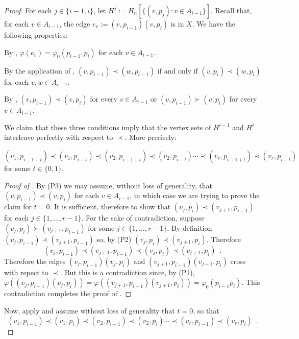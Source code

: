 \documentclass[kpfonts]{patmorin}
\begin{document}
\begin{proof}
    For each $j\in\{i-1,i\}$, let $H^j:=H_n[\{(v,p_j):v\in A_{i-1}\}]$.
    Recall that, for each $v\in A_{i-1}$, the edge $e_v:=(v,p_{i-1})(v,p_i)$ is in $X$.  We have the following properties:
    \begin{compactenum}[(P1)]
        \item By , $\varphi(e_v)=\varphi_0(p_{i-1},p_i)$ for each $v\in A_{i-1}$.
        \item By the application of , $(v,p_{i-1})\prec (w,p_{i-1})$ if and only if $(v,p_{i})\prec (w,p_{i})$ for each $v,w\in A_{i-1}$.
        \item By , $(v,p_{i-1})\prec (v,p_i)$ for every $v\in A_{i-1}$ or $(v,p_{i-1})\succ (v,p_i)$ for every $v\in A_{i-1}$.
    \end{compactenum}
    We claim that these three conditions imply that the vertex sets of $H^{i-1}$ and $H^{i}$ interleave perfectly with respect to $\prec$. More precisely:
	\begin{clm} $(v_1,p_{i-1+t})\prec (v_1,p_{i-t}) \prec (v_2,p_{i-1+t}) \prec (v_2,p_{i-t}) \cdots \prec (v_r,p_{i-1+t}) \prec (v_r,p_{i-t})$ for some $t\in\{0,1\}$.
	\end{clm}
	\begin{proof}[Proof of ]
		By (P3) we may assume, without loss of generality, that $(v,p_{i-1})\prec (v,p_i)$ for each $v\in A_{i-1}$, in which case we are trying to prove the claim for $t=0$.  It is sufficient, therefore to show that $(v_j,p_i)\prec (v_{j+1},p_{i-1})$ for each $j\in\{1,\ldots,r-1\}$.  For the sake of contradiction, suppose $(v_j,p_{i})\succ (v_{j+1},p_{i-1})$ for some $j\in\{1,\ldots,r-1\}$. By definition $(v_j,p_{i-1})\prec (v_{j+1},p_{i-1})$ so, by (P2)  $(v_{j},p_i) \prec (v_{j+1},p_i)$.  Therefore
		\[
			(v_j,p_{i-1})\prec (v_{j+1},p_{i-1})\prec(v_{j},p_i) \prec
		   (v_{j+1}, p_i) \enspace .
	   	\]
		Therefore the edges $(v_j,p_{i-1})(v_j,p_{i})$ and $(v_{j+1},p_{i-1})(v_{j+1},p_i)$ cross with repect to $\prec$.  But this is a contradiction since, by (P1),  $\varphi((v_j,p_{i-1})(v_j,p_{i})) =\varphi((v_{j+1},p_{i-1})(v_{j+1},p_i))=\varphi_0(p_{i-1}p_i)$.
		This contradiction completes the proof of .
	\end{proof}


	Now, apply  and assume without loss of generality that $t=0$, so that
	\[
		(v_1,p_{i-1})\prec (v_1,p_{i}) \prec (v_2,p_{i-1}) \prec (v_2,p_{i}) \cdots \prec (v_r,p_{i-1}) \prec (v_r,p_{i}) \enspace .
	\]


\end{proof}
\end{document}
